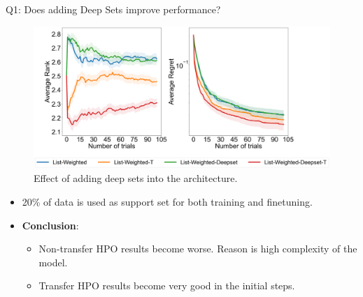 \documentclass{beamer}
\begin{document}
\begin{frame}[t]{Q1: Does adding Deep Sets improve performance?}

\begin{figure}[h]
  \centering
    \includegraphics[scale=0.12]{images/Q3Ablation}
    \caption{Effect of adding deep sets into the architecture.}
    \label{fig:Q3Ablation}
\end{figure}

\begin{itemize}
\item 20\% of data is used as support set for both training and finetuning.
\item \textbf{Conclusion}:
\begin{itemize}
\item Non-transfer HPO results become worse.  Reason is high complexity of the model.
\item Transfer HPO results become very good in the initial steps.
\end{itemize}
\end{itemize}

\end{frame}
\end{document}
